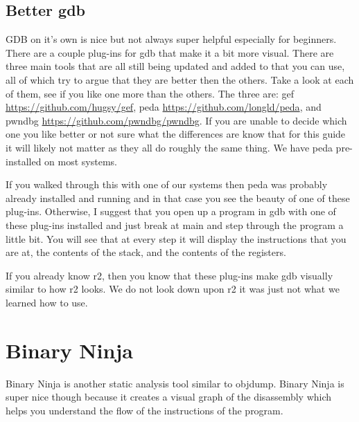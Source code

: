 \documentclass{report}
\begin{document}
\subsection{Better gdb}
GDB on it's own is nice but not always super helpful especially for beginners.  There are a couple plug-ins for gdb that make it a bit more visual.  There are three main tools that are all still being updated and added to that you can use, all of which try to argue that they are better then the others.  Take a look at each of them, see if you like one more than the others.  The three are: gef \url{https://github.com/hugsy/gef}, peda \url{https://github.com/longld/peda}, and pwndbg \url{https://github.com/pwndbg/pwndbg}.  If you are unable to decide which one you like better or not sure what the differences are know that for this guide it will likely not matter as they all do roughly the same thing.  We have peda pre-installed on most systems.  

If you walked through this with one of our systems then peda was probably already installed and running and in that case you see the beauty of one of these plug-ins.  Otherwise, I suggest that you open up a program in gdb with one of these plug-ins installed and just break at main and step through the program a little bit.  You will see that at every step it will display the instructions that you are at, the contents of the stack, and the contents of the registers.  

If you already know r2, then you know that these plug-ins make gdb visually similar to how r2 looks.  We do not look down upon r2 it was just not what we learned how to use.


\section{Binary Ninja}
Binary Ninja is another static analysis tool similar to objdump.  Binary Ninja is super nice though because it creates a visual graph of the disassembly which helps you understand the flow of the instructions of the program.
\end{document}
